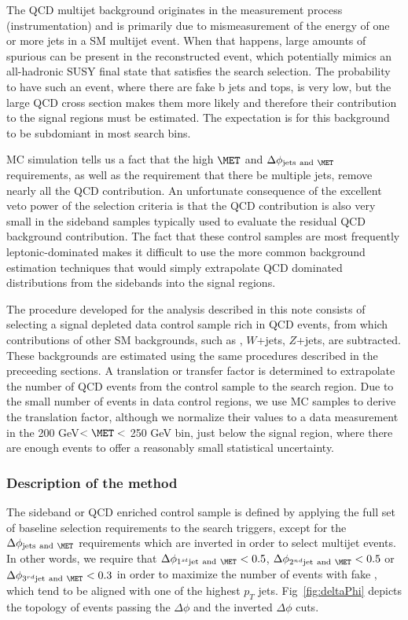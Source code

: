 %
%

The QCD multijet background originates in the measurement process (instrumentation) and is primarily due to mismeasurement of the energy of one or more jets in a SM multijet event. When that happens, large amounts of spurious \MET can be present in the reconstructed event, which potentially mimics an all-hadronic SUSY final state that satisfies the search selection. The probability to have such an event, where there are fake b jets and tops, is very low, but the large QCD cross section makes them more likely and therefore their contribution to the signal regions must be estimated. The expectation is for this background to be subdomiant in most search bins.

MC simulation tells us a fact that the high $\MET$ and
$\Delta\phi_{\mathrm{jets~and}~\MET}$ requirements, as well as the requirement that there be multiple jets, 
remove nearly all the QCD contribution. An unfortunate consequence of the excellent veto power of the selection
criteria is that the QCD contribution is also very small 
in the sideband samples typically used to evaluate the residual QCD background 
contribution. The fact that these control samples are most frequently 
leptonic-\ttbar dominated makes it difficult to use the more common background 
estimation techniques that would simply extrapolate QCD dominated distributions 
from the sidebands into the signal regions. 

The procedure developed for the analysis described in this note consists
of selecting a signal depleted data control sample rich in QCD events, 
from which contributions of other SM backgrounds, such as \ttbar, $W$+jets, 
$Z$+jets, are subtracted. These backgrounds
are estimated using the same procedures described in the preceeding sections.  
A translation or transfer factor is determined to extrapolate the
number of QCD events from the control sample to the 
search region. Due to the small number of events in data control regions, we use MC samples to
derive the translation factor, although we normalize their values to a 
data measurement in the 200 GeV$<\MET<$ 250 GeV bin, just below the 
signal region, where there are enough events to offer a reasonably small statistical uncertainty.

\subsubsection{Description of the method}

The sideband or QCD enriched control sample is defined by applying 
the full set of baseline selection requirements to the search triggers, except for the $\Delta\phi_{\mathrm{jets~and}~\MET}$ 
requirements which are inverted in order to select multijet events. In other words,
we require that
$\Delta\phi_{1^{st}\mathrm{jet~and}~\MET} < 0.5$, 
$\Delta\phi_{2^{nd} \mathrm{jet~and}~\MET} < 0.5$ or 
$\Delta\phi_{3^{rd} \mathrm{jet~and}~\MET} < 0.3$ in order to maximize the 
number of events with fake \MET, which tend to be aligned with one of the 
highest $p_{T}$ jets.
Fig~\ref{fig:deltaPhi} depicts the topology of events passing the 
$\Delta\phi$ and the inverted $\Delta\phi$ cuts.

